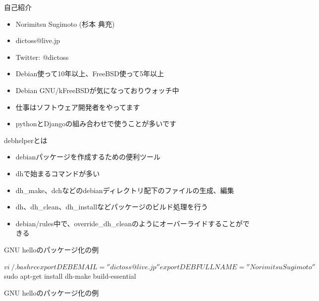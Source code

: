 \begin{frame}{自己紹介}
  \begin{itemize}
  \item Norimitsu Sugimoto (杉本 典充)
  \item dictoss@live.jp
  \item Twitter: @dictoss
  \item Debian使って10年以上、FreeBSD使って5年以上
  \item Debian GNU/kFreeBSDが気になっておりウォッチ中
  \item 仕事はソフトウェア開発者をやってます
  \item pythonとDjangoの組み合わせで使うことが多いです
  \end{itemize}
\end{frame}



\begin{frame}[containsverbatim]{debhelperとは}
  \begin{itemize}
  \item debianパッケージを作成するための便利ツール
  \item dhで始まるコマンドが多い
  \item dh\_make、dchなどのdebianディレクトリ配下のファイルの生成、編集
  \item dh、dh\_clean、dh\_installなどパッケージのビルド処理を行う
  \item debian/rules中で、override\_dh\_cleanのようにオーバーライドすることができる
  \end{itemize}
\end{frame}


\begin{frame}[containsverbatim]{GNU helloのパッケージ化の例}
  \begin{commandline}
    $ vi ~/.bashrc
    export DEBEMAIL=''dictoss@live.jp''
    export DEBFULLNAME=''Norimitsu Sugimoto''
    
    $ sudo apt-get install dh-make build-essential
  \end{commandline}
\end{frame}

\begin{frame}[containsverbatim]{GNU helloのパッケージ化の例}
\end{frame}


